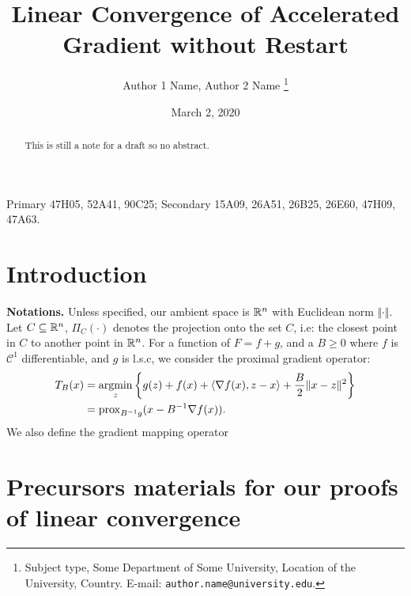 \documentclass[12pt]{article}
\begin{document}
\newcommand{\dist}{\ensuremath{\operatorname{dist}}}

\title{{\selectfont Linear Convergence of Accelerated Gradient without Restart}}

\author{
    Author 1 Name, Author 2 Name
    \thanks{
        Subject type, Some Department of Some University, Location of the University,
        Country. E-mail: \texttt{author.name@university.edu}.
    }
}

\date{March 2, 2020}

\maketitle
{}

\begin{abstract} 
    \noindent
    This is still a note for a draft so no abstract. 
\end{abstract}

Primary 47H05, 52A41, 90C25; Secondary 15A09, 26A51, 26B25, 26E60, 47H09, 47A63.


\section{Introduction}
    \textbf{Notations.}
    Unless specified, our ambient space is $\mathbb R^n$ with Euclidean norm $\Vert \cdot\Vert$.
    Let $C\subseteq \mathbb R^n$, $\Pi_C(\cdot)$ denotes the projection onto the set $C$, i.e: the closest point in $C$ to another point in $\mathbb R^n$. 
    For a function of $F = f + g$, and a $B\ge 0$ where $f$ is $\mathcal C^1$ differentiable, and $g$ is l.s.c, we consider the proximal gradient operator: 
    \begin{align*}
        T_B(x) &= \mathop{\rm argmin}\limits_{z} \left\lbrace
            g(z) + f(x) + \langle \nabla f(x), z - x\rangle + \frac{B}{2}\Vert x - z\Vert^2
        \right\rbrace
        \\
        &= \operatorname{prox}_{B^{-1}g}(x - B^{-1}\nabla f(x)). 
    \end{align*}
    We also define the gradient mapping operator

\section{Precursors materials for our proofs of linear convergence}
    \begin{definition}\label{def:st-apg}
        
    \end{definition}
\end{document}
